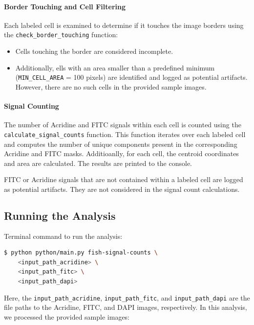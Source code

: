 \documentclass[a4paper,12pt]{article}
\begin{document}
\paragraph{Border Touching and Cell Filtering}

Each labeled cell is examined to determine if it touches the image borders using the \texttt{check\_border\_touching} function:
\begin{itemize}
    \item Cells touching the border are considered incomplete.
    \item Additionally, ells with an area smaller than a predefined minimum (\texttt{MIN\_CELL\_AREA} = 100 pixels) are identified and logged as potential artifacts. However, there are no such cells in the provided sample images.
\end{itemize}

\paragraph{Signal Counting}

The number of Acridine and FITC signals within each cell is counted using the \texttt{calculate\_signal\_counts} function. This function iterates over each labeled cell and computes the number of unique components present in the corresponding Acridine and FITC masks. Additioanlly, for each cell, the centroid coordinates and area are calculated. The results are printed to the console.

FITC or Acridine signals that are not contained within a labeled cell are logged as potential artifacts. They are not considered in the signal count calculations.

\subsection{Running the Analysis}

Terminal command to run the analysis:

\begin{lstlisting}[language=bash]
$ python python/main.py fish-signal-counts \
    <input_path_acridine> \
    <input_path_fitc> \
    <input_path_dapi>
\end{lstlisting}

Here, the \texttt{input\_path\_acridine}, \texttt{input\_path\_fitc}, and \texttt{input\_path\_dapi} are the file paths to the Acridine, FITC, and DAPI images, respectively. In this analysis, we processed the provided sample images:
\end{document}
